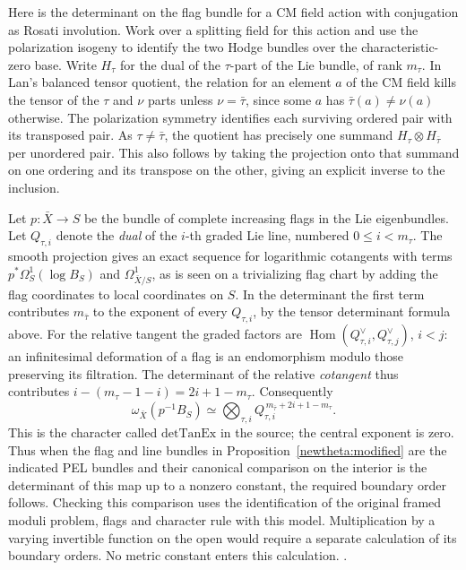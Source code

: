 Here is the determinant on the flag bundle for a CM field action
with conjugation as Rosati involution. Work over a splitting field
for this action and use the polarization isogeny to identify the two
Hodge bundles over the characteristic-zero base. Write \(H_\tau\)
for the dual of the \(\tau\)-part of the Lie bundle, of rank \(m_\tau\).
In Lan's balanced tensor quotient, the relation for an element
\(a\) of the CM field kills the tensor of the \(\tau\) and
\(\nu\) parts unless \(\nu=\bar\tau\), since some \(a\) has
\(\bar\tau(a)\ne\nu(a)\) otherwise. The polarization symmetry
identifies each surviving ordered pair with its transposed pair.
As \(\tau\ne\bar\tau\), the quotient has precisely one summand
\(H_\tau\otimes H_{\bar\tau}\) per unordered pair. This also follows
by taking the projection onto that summand on one ordering and its
transpose on the other, giving an explicit inverse to the inclusion.

Let \(p:\bar X\to S\) be the bundle of complete increasing flags
in the Lie eigenbundles. Let \(Q_{\tau,i}\) denote the
\emph{dual} of the \(i\)-th graded Lie line, numbered
\(0\le i<m_\tau\). The smooth projection gives an exact sequence
for logarithmic cotangents with terms \(p^*\Omega^1_S(\log B_S)\)
and \(\Omega^1_{\bar X/S}\), as is seen on a trivializing flag
chart by adding the flag coordinates to local coordinates on \(S\).
In the determinant the first term contributes \(m_{\bar\tau}\) to
the exponent of every \(Q_{\tau,i}\), by the tensor determinant
formula above. For the relative tangent the graded factors are
\(\operatorname{Hom}(Q_{\tau,i}^{\vee},Q_{\tau,j}^{\vee})\),
\(i<j\): an infinitesimal deformation of a flag is an
endomorphism modulo those preserving its filtration.
The determinant of the relative \emph{cotangent} thus contributes
\(i-(m_\tau-1-i)=2i+1-m_\tau\). Consequently
\[
 \omega_{\bar X}(p^{-1}B_S)
 \simeq\bigotimes_{\tau,i}
 Q_{\tau,i}^{\,m_{\bar\tau}+2i+1-m_\tau}.
\]
This is the character called \(\mathrm{detTanEx}\) in the source;
the central exponent is zero. Thus when the flag and line bundles
in Proposition~\ref{newtheta:modified} are the indicated PEL bundles
and their canonical comparison on the interior is the determinant
of this map up to a nonzero constant, the required boundary order
follows. Checking this comparison uses the identification of the
original framed moduli problem, flags and character rule with this
model. Multiplication by a varying invertible function on the open
would require a separate calculation of its boundary orders.
No metric constant enters this calculation.
.

